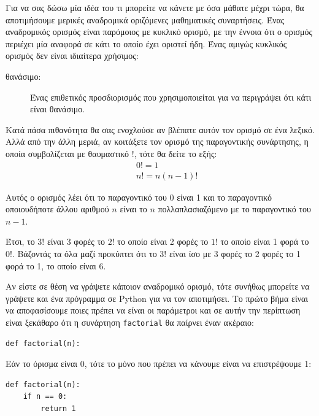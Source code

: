 \documentclass[10pt]{book}
\begin{document}
Για να σας δώσω μία ιδέα του τι μπορείτε να κάνετε με όσα μάθατε μέχρι τώρα,
θα αποτιμήσουμε μερικές αναδρομικά οριζόμενες μαθηματικές συναρτήσεις. Ένας
αναδρομικός ορισμός είναι παρόμοιος με κυκλικό ορισμό, με την έννοια ότι ο
ορισμός περιέχει μία αναφορά σε κάτι το οποίο έχει οριστεί ήδη. Ένας αμιγώς 
κυκλικός ορισμός δεν είναι ιδιαίτερα χρήσιμος:

\begin{description}

\item[θανάσιμο:] Ένας επιθετικός προσδιορισμός που χρησιμοποιείται για να περιγράψει ότι κάτι είναι θανάσιμο.

\end{description}

Κατά πάσα πιθανότητα θα σας ενοχλούσε αν βλέπατε αυτόν τον ορισμό σε ένα λεξικό. Αλλά από την άλλη μεριά, αν κοιτάξετε τον ορισμό της παραγοντικής συνάρτησης, η οποία συμβολίζεται με θαυμαστικό $!$, τότε θα δείτε το εξής:
%
\begin{eqnarray*}
&&  0! = 1 \\
&&  n! = n (n-1)!
\end{eqnarray*}
%

Αυτός ο ορισμός λέει ότι το παραγοντικό του 0 είναι 1 και το παραγοντικό
οποιουδήποτε άλλου αριθμού $n$ είναι το $n$ πολλαπλασιαζόμενο με
το παραγοντικό του $n-1$. 

Έτσι, το $3!$ είναι 3 φορές το $2!$ το οποίο είναι 2 φορές το $1!$ το οποίο είναι 1 φορά το $0!$. Βάζοντάς τα όλα μαζί προκύπτει ότι το $3!$ είναι ίσο με 3 φορές το 2 φορές το 1 φορά το 1, το οποίο είναι 6.

Αν είστε σε θέση να γράψετε κάποιον αναδρομικό ορισμό, τότε συνήθως μπορείτε
να γράψετε και ένα πρόγραμμα σε Python για να τον αποτιμήσει.
Το πρώτο βήμα είναι να αποφασίσουμε ποιες πρέπει να είναι οι παράμετροι και
σε αυτήν την περίπτωση είναι ξεκάθαρο ότι η συνάρτηση {\tt factorial} θα
παίρνει έναν ακέραιο:

\begin{verbatim}
def factorial(n):
\end{verbatim}
%

Εάν το όρισμα είναι 0, τότε το μόνο που πρέπει να κάνουμε είναι να
επιστρέψουμε 1:

\begin{verbatim}
def factorial(n):
    if n == 0:
        return 1
\end{verbatim}
%
\end{document}
